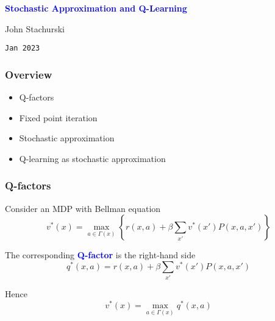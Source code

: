 \documentclass[xcolor=dvipsnames]{beamer}  %
\newcommand{\navy}[1]{\textcolor{blue}{\bf #1}}
\newcommand{\1}{\mathbbm 1}
\begin{document}


\begin{frame}
    
    \begin{center}
        \navy{\Large{Stochastic Approximation and Q-Learning}}

        
        \vspace{2em}
        John Stachurski 

        \vspace{1em}
        \vspace{1em}
        \texttt{Jan 2023}

    \end{center}

\end{frame}

\begin{frame}
    \frametitle{Overview}
    
    \begin{itemize}
        \item Q-factors
            \vspace{0.5em}
        \item Fixed point iteration
            \vspace{0.5em}
        \item Stochastic approximation
            \vspace{0.5em}
        \item Q-learning as stochastic approximation
    \end{itemize}

\end{frame}


\begin{frame}
    \frametitle{Q-factors}

    Consider an MDP with Bellman equation
    \begin{equation*}
        v^*(x) = \max_{a \in \Gamma(x)}
        \left\{
            r(x,a) + \beta \sum_{x'} v^*(x') P(x,a,x')
        \right\}
    \end{equation*}

    \vspace{0.5em}
    \vspace{0.5em}
    The corresponding \navy{Q-factor} is the right-hand side
    \begin{equation*}
        q^*(x,a) = r(x,a) + \beta \sum_{x'} v^*(x') P(x,a,x')
    \end{equation*}

    Hence
    \begin{equation*}
        v^*(x)  = \max_{a \in \Gamma(x)} q^*(x,a)
    \end{equation*}

\end{frame}
\end{document}
